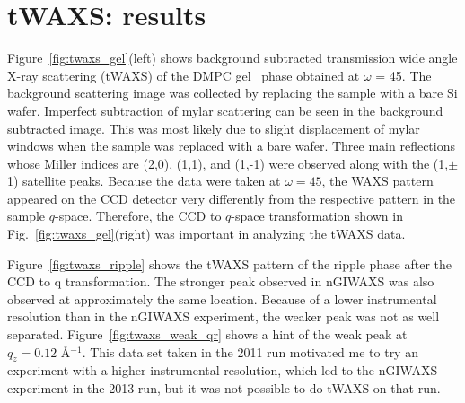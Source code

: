 



\newpage
\section{tWAXS: results}\label{sec:tWAXS_results}
Figure~\ref{fig:twaxs_gel}(left) shows background subtracted transmission wide
angle X-ray scattering (tWAXS) of the DMPC gel \LbetaI\ phase obtained at 
$\omega$ = 45\textdegree.
The background scattering image was collected by replacing 
the sample with a bare Si wafer. Imperfect subtraction of mylar scattering 
can be seen in the background subtracted image. 
This was most likely due to slight displacement of mylar windows
when the sample was replaced with a bare wafer. 
Three main reflections whose Miller indices 
are (2,0), (1,1), and (1,-1) were observed along with the (1,$\pm$1) satellite 
peaks.
Because the data were taken at $\omega=45$\textdegree, the WAXS pattern 
appeared on the CCD detector very differently from the respective pattern
in the sample $q$-space. 
Therefore, the CCD to $q$-space transformation shown in 
Fig.~\ref{fig:twaxs_gel}(right) was important in analyzing the tWAXS data. 

Figure~\ref{fig:twaxs_ripple} shows the tWAXS pattern of the ripple phase 
after the CCD to q transformation. The stronger
peak observed in nGIWAXS was also observed at approximately the same location.
Because of a lower instrumental resolution than in the nGIWAXS experiment,
the weaker peak was not as well separated. Figure~\ref{fig:twaxs_weak_qr} shows
a hint of the weak peak at $q_z=0.12$ \AA$^{-1}$. This
data set taken in the 2011 run motivated me to try an experiment
with a higher instrumental resolution, which led to the nGIWAXS experiment
in the 2013 run, but it was not possible to do tWAXS on that run.

